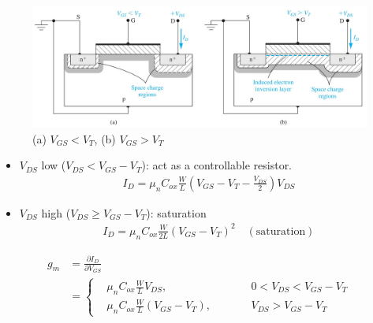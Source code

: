 \documentclass[a4paper, twocolumn]{article}
\begin{document}
    \begin{figure}[H]
        \centering
        \includegraphics[width=0.9\linewidth]{Current-voltage-relationship.jpg}
        \caption{(a) $V_{GS} < V_T$, (b) $V_{GS} > V_T$}
        \label{fig:Current-voltage-relationship.jpg}
    \end{figure}
    \begin{itemize}
        \item $V_{DS} $ low ($V_{DS} < V_{GS} - V_T$): act as a controllable resistor.
        \begin{equation*}
            \begin{aligned}
                \boxed{I_D = \mu_n C_{ox} \frac{W}{L} \left( V_{GS}  - V_T - \frac{V_{DS}}{2}  \right) V_{DS}}
            \end{aligned}
        \end{equation*}
        \item $V_{DS}$ high ($V_{DS} \ge V_{GS} - V_T $): saturation
        \begin{equation*}
            \begin{aligned}
                \boxed{I_D = \mu_n C_{ox} \frac{W}{2L} \left( V_{GS} - V_T \right)^2 \quad (\text{saturation})}
            \end{aligned}
        \end{equation*}
    \end{itemize}
    \begin{equation*}
        \begin{aligned}
            g_{m} &= \frac{\partial I_D}{\partial V_{GS} } \\ 
            &= \left\{
                \begin{aligned}
                    & \mu_n C_{ox} \frac{W}{L} V_{DS} ,\qquad&& 0 < V_{DS} < V_{GS} - V_T \\
                    & \mu_n C_{ox} \frac{W}{L} \left( V_{GS}  - V_T \right) ,\qquad&& V_{DS} > V_{GS} - V_T
                \end{aligned}
            \right.
        \end{aligned}
    \end{equation*}
\end{document}
